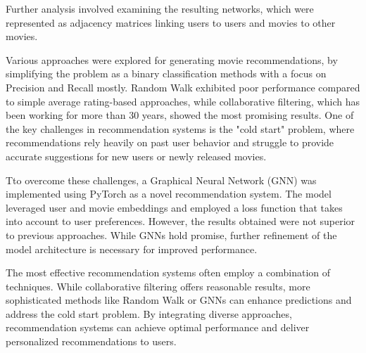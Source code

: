 \documentclass[12pt]{article}
\numberwithin{equation}{section}
\begin{document}
Further analysis involved examining the resulting networks, which were represented as adjacency matrices linking users to users and movies to other movies. 

Various approaches were explored for generating movie recommendations, by simplifying the problem as a binary classification methods with a focus on Precision and Recall mostly. Random Walk exhibited poor performance compared to simple average rating-based approaches, while collaborative filtering, which has been working for more than 30 years, showed the most promising results. One of the key challenges in recommendation systems is the "cold start" problem, where recommendations rely heavily on past user behavior and struggle to provide accurate suggestions for new users or newly released movies.

Tto overcome these challenges, a Graphical Neural Network (GNN) was implemented using PyTorch as a novel recommendation system. The model leveraged user and movie embeddings and employed a loss function that takes into account to user preferences. However, the results obtained were not superior to previous approaches. While GNNs hold promise, further refinement of the model architecture is necessary for improved performance.

The most effective recommendation systems often employ a combination of techniques. While collaborative filtering offers reasonable results, more sophisticated methods like Random Walk or GNNs can enhance predictions and address the cold start problem. By integrating diverse approaches, recommendation systems can achieve optimal performance and deliver personalized recommendations to users.


\vspace{1em} 




\newpage



\printbibliography
\end{document}
